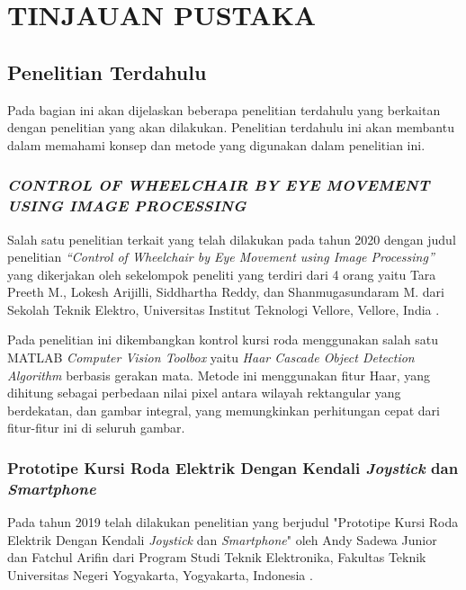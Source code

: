 \chapter{TINJAUAN PUSTAKA}
\label{chap:tinjauanpustaka}


\section{Penelitian Terdahulu}
\label{sec:PenelitianTerdahulu}

Pada bagian ini akan dijelaskan beberapa penelitian terdahulu yang berkaitan dengan penelitian yang akan dilakukan. Penelitian terdahulu ini akan membantu dalam memahami konsep dan metode yang digunakan dalam penelitian ini.

\subsection{\textit{CONTROL OF WHEELCHAIR BY EYE MOVEMENT USING IMAGE PROCESSING}}

Salah satu penelitian terkait yang telah dilakukan pada tahun 2020 dengan judul penelitian \textit{“Control of Wheelchair by Eye Movement using Image Processing”} yang dikerjakan oleh sekelompok peneliti yang terdiri dari 4 orang yaitu Tara Preeth M., Lokesh Arijilli, Siddhartha Reddy, dan Shanmugasundaram M. dari Sekolah Teknik Elektro, Universitas Institut Teknologi Vellore, Vellore, India \parencite{control_2020}.

Pada penelitian ini dikembangkan kontrol kursi roda menggunakan salah satu MATLAB \textit{Computer Vision Toolbox} yaitu\textit{ Haar Cascade Object Detection Algorithm} berbasis gerakan mata. Metode ini menggunakan fitur Haar, yang dihitung sebagai perbedaan nilai pixel antara wilayah rektangular yang berdekatan, dan gambar integral, yang memungkinkan perhitungan cepat dari fitur-fitur ini di seluruh gambar.

\subsection{Prototipe Kursi Roda Elektrik Dengan Kendali \emph{Joystick} dan \emph{Smartphone}}

Pada tahun 2019 telah dilakukan penelitian yang berjudul "Prototipe Kursi Roda Elektrik Dengan Kendali \emph{Joystick} dan \emph{Smartphone}" oleh Andy Sadewa Junior dan Fatchul Arifin dari Program Studi Teknik Elektronika, Fakultas Teknik Universitas Negeri Yogyakarta, Yogyakarta, Indonesia \parencite{junior2019prototipe}.


